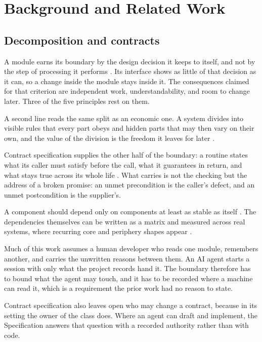 \section{Background and Related Work}
\label{sec:related}

\subsection{Decomposition and contracts}

A module earns its boundary by the design decision it keeps to itself, and not by the step of processing it performs \citep{parnas1972}. Its interface shows as little of that decision as it can, so a change inside the module stays inside it. The consequences claimed for that criterion are independent work, understandability, and room to change later. Three of the five principles rest on them.

A second line reads the same split as an economic one. A system divides into visible rules that every part obeys and hidden parts that may then vary on their own, and the value of the division is the freedom it leaves for later \citep{baldwinclark2000}.

Contract specification supplies the other half of the boundary: a routine states what its caller must satisfy before the call, what it guarantees in return, and what stays true across its whole life \citep{meyer1992}. What carries is not the checking but the address of a broken promise: an unmet precondition is the caller's defect, and an unmet postcondition is the supplier's.

A component should depend only on components at least as stable as itself \citep{martin2002}. The dependencies themselves can be written as a matrix \citep{steward1981} and measured across real systems, where recurring core and periphery shapes appear \citep{baldwin2014}.

Much of this work assumes a human developer who reads one module, remembers another, and carries the unwritten reasons between them. An AI agent starts a session with only what the project records hand it. The boundary therefore has to bound what the agent may touch, and it has to be recorded where a machine can read it, which is a requirement the prior work had no reason to state.

Contract specification also leaves open who may change a contract, because in its setting the owner of the class does. Where an agent can draft and implement, the Specification answers that question with a recorded authority rather than with code.

